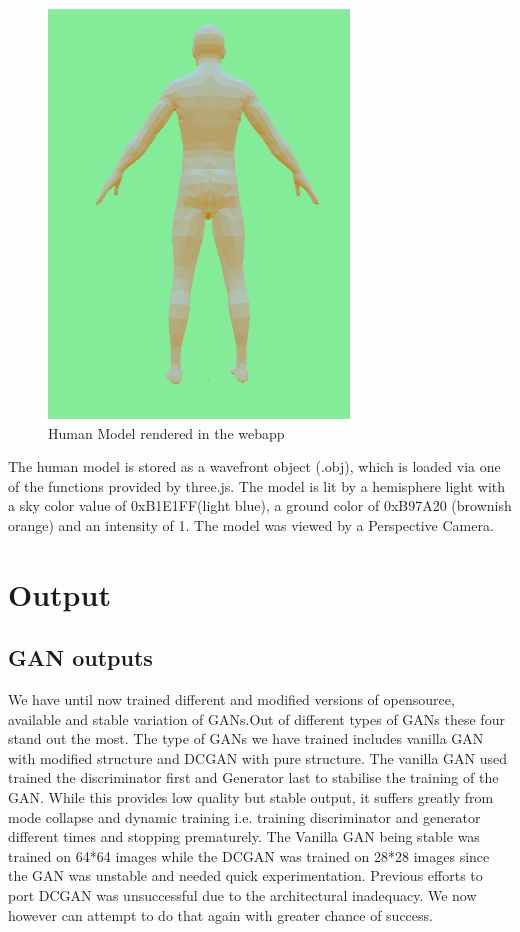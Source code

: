 \documentclass{article}
\begin{document}
\begin{figure}[H]
    \centering
    \includegraphics[width=8cm]{images/renderedHumanModel.png}
    \caption{Human Model rendered in the webapp}
    \label{fig:my_label}
\end{figure}

The human model is stored as a wavefront object (.obj), which is loaded via one of the functions provided by three.js. The model is lit by a hemisphere light with a sky color value of 0xB1E1FF(light blue), a ground color of 0xB97A20 (brownish orange) and an intensity of 1. The model was viewed by a Perspective Camera.
\newpage    
\section{Output}

\subsection{GAN outputs}

We have until now trained different and modified versions of opensource, available and stable variation of GANs.Out of different types of GANs these four stand out the most. The type of GANs we have trained includes vanilla GAN with modified structure and DCGAN with pure structure. The vanilla GAN used trained the discriminator first and Generator last to stabilise the training of the GAN. While this provides low quality but stable output, it suffers greatly from mode collapse and dynamic training i.e. training discriminator and generator different times and stopping prematurely. The Vanilla GAN being stable was trained on 64*64 images while the DCGAN was trained on 28*28 images since the GAN was unstable and needed quick experimentation. Previous efforts to port DCGAN was unsuccessful due to the architectural inadequacy. We now however can attempt to do that again with greater chance of success.
\end{document}
